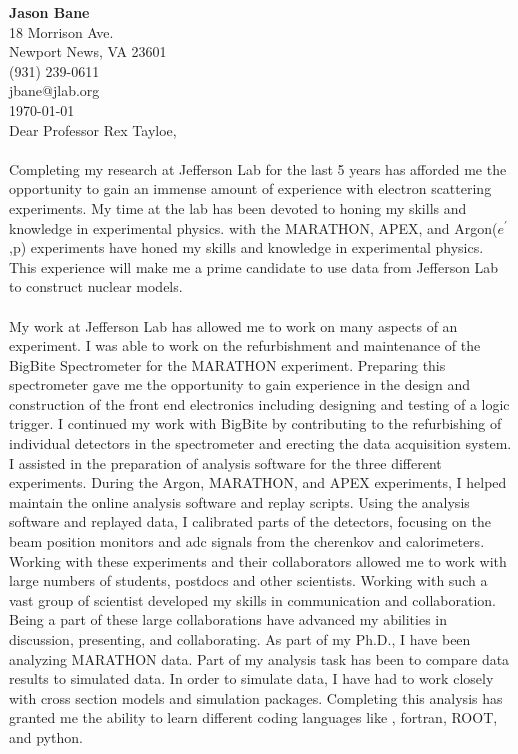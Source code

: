\vspace*{-1.2cm}
{\textbf{Jason Bane}}\\
18 Morrison Ave. \\
Newport News, VA 23601 \\
(931) 239-0611 \\
jbane@jlab.org \\
\today\\

Dear Professor Rex Tayloe, 

\paragraph{}Completing my research at Jefferson Lab for the last 5 years has afforded me the opportunity to gain an immense amount of experience with electron scattering experiments. My time at the lab has been devoted to honing my skills and knowledge in experimental physics. with the MARATHON, APEX, and Argon($e^\prime$,p) experiments have honed my skills and knowledge in experimental physics. This experience will make me a prime candidate to use data from Jefferson Lab to construct nuclear models. 
\paragraph{}My work at Jefferson Lab has allowed me to work on many aspects of an experiment. I was able to work on the refurbishment and maintenance of the BigBite Spectrometer for the MARATHON experiment. Preparing this spectrometer gave me the opportunity to gain experience in the design and construction of the front end electronics including designing and testing of a logic trigger. I continued my work with BigBite by contributing to the refurbishing of individual detectors in the spectrometer and erecting the data acquisition system. I assisted in the preparation of analysis software for the three different experiments. During the Argon, MARATHON, and APEX experiments, I helped maintain the online analysis software and replay scripts. Using the analysis software and replayed data, I calibrated parts of the detectors, focusing on the beam position monitors and adc signals from the cherenkov and calorimeters. Working with these experiments and their collaborators allowed me to work with large numbers of students, postdocs and other scientists.  Working with such a vast group of scientist developed my skills in communication and collaboration. Being a part of these large collaborations have advanced my abilities in discussion, presenting, and collaborating.
As part of my Ph.D., I have been analyzing MARATHON data. Part of my analysis task has been to compare data results to simulated data. In order to simulate data, I have had to work closely with cross section models and simulation packages. Completing this analysis has granted me the ability to learn different coding languages like \CPP, fortran, ROOT, and python.

